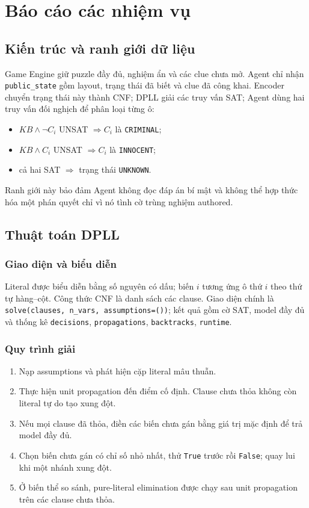 \documentclass[11pt,a4paper]{report}
\begin{document}
\chapter{Báo cáo các nhiệm vụ}

\section{Kiến trúc và ranh giới dữ liệu}
Game Engine giữ puzzle đầy đủ, nghiệm ẩn và các clue chưa mở. Agent chỉ nhận
\texttt{public\_state} gồm layout, trạng thái đã biết và clue đã công khai.
Encoder chuyển trạng thái này thành CNF; DPLL giải các truy vấn SAT; Agent dùng
hai truy vấn đối nghịch để phân loại từng ô:
\begin{itemize}
  \item $KB \land \neg C_i$ UNSAT $\Rightarrow C_i$ là \texttt{CRIMINAL};
  \item $KB \land C_i$ UNSAT $\Rightarrow C_i$ là \texttt{INNOCENT};
  \item cả hai SAT $\Rightarrow$ trạng thái \texttt{UNKNOWN}.
\end{itemize}
Ranh giới này bảo đảm Agent không đọc đáp án bí mật và không thể hợp thức hóa
một phán quyết chỉ vì nó tình cờ trùng nghiệm authored.

\section{Thuật toán DPLL}

\subsection{Giao diện và biểu diễn}
Literal được biểu diễn bằng số nguyên có dấu; biến $i$ tương ứng ô thứ $i$ theo
thứ tự hàng--cột. Công thức CNF là danh sách các clause. Giao diện chính là
\texttt{solve(clauses, n\_vars, assumptions=())}; kết quả gồm cờ SAT, model đầy
đủ và thống kê \texttt{decisions}, \texttt{propagations}, \texttt{backtracks},
\texttt{runtime}.

\subsection{Quy trình giải}
\begin{enumerate}
  \item Nạp assumptions và phát hiện cặp literal mâu thuẫn.
  \item Thực hiện unit propagation đến điểm cố định. Clause chưa thỏa không còn
        literal tự do tạo xung đột.
  \item Nếu mọi clause đã thỏa, điền các biến chưa gán bằng giá trị mặc định để
        trả model đầy đủ.
  \item Chọn biến chưa gán có chỉ số nhỏ nhất, thử \texttt{True} trước rồi
        \texttt{False}; quay lui khi một nhánh xung đột.
  \item Ở biến thể so sánh, pure-literal elimination được chạy sau unit
        propagation trên các clause chưa thỏa.
\end{enumerate}
\end{document}
